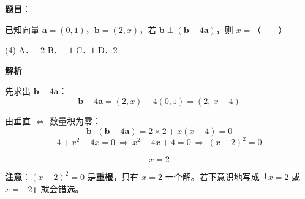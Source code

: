 \begin{answer}

\textbf{题目}：

已知向量 $\boldsymbol a=(0,1)$，$\boldsymbol b=(2,x)$，若 $\boldsymbol b\perp(\boldsymbol b-4\boldsymbol a)$，则 $x=$\mbox{（　　）}

\begin{gkopts}(4)
\task A．$-2$
\task B．$-1$
\task C．$1$
\task D．$2$
\end{gkopts}

\textbf{解析}

先求出 $\boldsymbol b-4\boldsymbol a$：
\nopagebreak[4]
\[\boldsymbol b-4\boldsymbol a=(2,x)-4(0,1)=(2,\ x-4)\]

由垂直 $\iff$ 数量积为零：
\nopagebreak[4]
\[\boldsymbol b\cdot(\boldsymbol b-4\boldsymbol a)=2\times2+x(x-4)=0\]
\nopagebreak[4]
\[4+x^{2}-4x=0\ \Longrightarrow\ x^{2}-4x+4=0\ \Longrightarrow\ (x-2)^{2}=0\]

\nopagebreak[4]
\[x=2\]

\begin{gktip}
\textbf{注意}：$(x-2)^2=0$ 是\textbf{重根}，只有 $x=2$ 一个解。若下意识地写成「$x=2$ 或 $x=-2$」就会错选。
\end{gktip}


\par\medskip

\end{answer}
